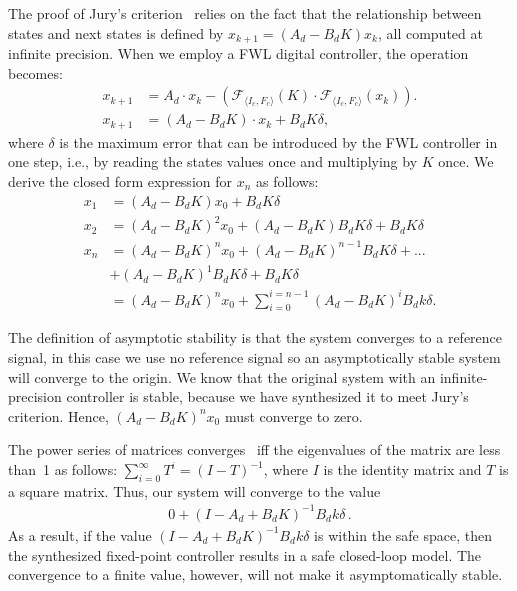 \documentclass[twocolumn]{autart}    %
\begin{document}
The proof of Jury's criterion~\cite{fadali} relies on the fact that the relationship between states and
next states is defined by $x_{k+1} = (A_d - B_dK) x_k$, all computed
at infinite precision.  When we employ a FWL digital controller, the
operation becomes:
%
\begin{align*}
x_{k+1} &= A_d \cdot x_{k} -(\mathcal{F}_{\langle I_c,F_c \rangle}(K)\cdot\mathcal{F}_{\langle I_c,F_c \rangle}(x_{k})).  \\
x_{k+1} &= (A_d  - B_dK) \cdot x_k + B_dK\delta, 
\end{align*}
%
where $\delta$ is the maximum error that can be introduced by the FWL
controller in one step, i.e., by reading the states values once and
multiplying by $K$ once.  We derive the closed form expression for $x_n$ as
follows:
%
\begin{align*}
x_{1} &= (A_d  - B_dK)x_0 + B_dK\delta \\
x_{2} 
 &=(A_d  - B_dK)^2x_0 + (A_d  - B_dK)B_dK\delta + B_dK\delta \\
x_{n} &= (A_d  - B_dK)^nx_0 + (A_d  - B_dK)^{n-1}B_dK\delta + ... \\  \nonumber & + (A_d  - B_dK)^1B_dK \delta + B_dK\delta \\
  &= (A_d - B_dK)^nx_0 + \sum_{i=0}^{i=n-1}(A_d - B_dK)^iB_dk\delta. 
\end{align*}

The definition of asymptotic stability is that the system converges to a
reference signal, in this case we use no reference signal so an
asymptotically stable system will converge to the origin.  We know that the
original system with an infinite-precision controller is stable, because we
have synthesized it to meet Jury's criterion.  Hence, $(A_d - B_dK)^n x_0$ 
must converge to zero.

The power series of matrices
converges~\cite{horn1990matrix} iff the eigenvalues of the matrix are less
than~1 as follows:
%
$\sum_{i=0}^{\infty}T^i  = (I - T)^{-1}$, 
%
where $I$ is the identity matrix and $T$ is a square matrix. Thus, our system will converge to the value 
%
\begin{align*}
0 + (I - A_d + B_dK)^{-1}B_dk\delta \,. 
\end{align*}
%
As a result, if the value $(I - A_d + B_dK)^{-1}B_dk\delta$ is within the
safe space, then the synthesized fixed-point controller results in a safe
closed-loop model.  The convergence to a finite value, however, will not
make it asymptomatically stable.
\end{document}
